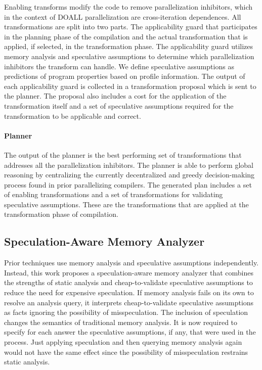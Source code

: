 Enabling transforms modify the code to remove parallelization
inhibitors, which in the context of DOALL parallelization are
cross-iteration dependences.
%
All transformations are split into two parts. The applicability guard
that participates in the planning phase of the compilation and the
actual transformation that is applied, if selected, in the
transformation phase.
The applicability guard utilizes memory analysis and speculative
assumptions to determine which parallelization inhibitors the
transform can handle.
%
We define speculative assumptions as predictions of program properties
based on profile information.
%
%
The output of each applicability guard is collected in a
transformation proposal which is sent to the planner.
%
%
The proposal also includes a cost for the application of the
transformation itself and a set of speculative assumptions required
for the transformation to be applicable and correct.

\paragraph{Planner}

%
The output of the planner is the best performing set of
transformations that addresses all the parallelization inhibitors.
%
The planner is able to perform global reasoning by centralizing the
currently decentralized and greedy decision-making process found in
prior parallelizing compilers.
%
The generated plan includes a set of enabling transformations and a
set of transformations for validating speculative assumptions.
%
These are the transformations that are applied at the transformation
phase of compilation.

\subsection{Speculation-Aware Memory Analyzer}

Prior techniques use memory analysis and speculative assumptions
independently.  Instead, this work proposes a speculation-aware memory
analyzer that combines the strengths of static analysis and
cheap-to-validate speculative assumptions to reduce the need for
expensive speculation.  If memory analysis fails on its own to resolve
an analysis query, it interprets cheap-to-validate speculative
assumptions as facts ignoring the possibility of misspeculation.
%
The inclusion of speculation changes the semantics of traditional
memory analysis. It is now required to specify for each answer the
speculative assumptions, if any, that were used in the process.
%
Just applying speculation and then querying memory analysis again
would not have the same effect since the possibility of misspeculation
restrains static analysis.

